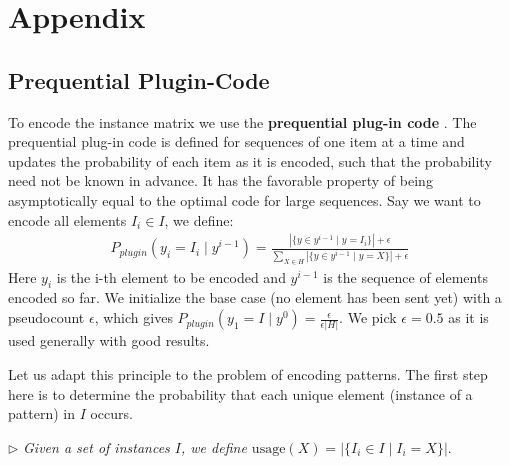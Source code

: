 \documentclass{llncs}
\begin{document}
\section{Appendix}
\label{appendix_a}
\subsection{Prequential Plugin-Code}

To encode the instance matrix we use the \textbf{prequential plug-in code} \cite{grunwaldmdl}. The prequential plug-in code is defined for sequences of one item at a time and updates the probability of each item as it is encoded, such that the probability need not be known in advance. It has the favorable property of being asymptotically equal to the optimal code for large sequences. Say we want to encode all elements ${I}_i \in {I}$, we define:
\begin{align}
P_{plugin}( y_i = {I}_i \mid y^{i-1} ) = \frac{|\{y \in y^{i-1} \mid y = {I}_i\}| + \epsilon }{\sum_{X \in H}|\{y \in y^{i-1} \mid y = X\}| + \epsilon}
\end{align}
Here $y_i$ is the i-th element to be encoded and $y^{i-1}$ is the sequence of elements encoded so far. We initialize the base case (no element has been sent yet) with a pseudocount $\epsilon$, which gives $P_{plugin}( y_1 = {I} \mid y^{0} ) = \frac{\epsilon}{\epsilon|H|}$. We pick $\epsilon=0.5$ as it is used generally with good results.

Let us adapt this principle to the problem of encoding patterns. The first step here is to determine the probability that each unique element (instance of a pattern) in ${I}$ occurs. 

\label{usage}
\smallskip \noindent $\triangleright$
\emph{Given a set of instances ${I}$, we define $\mathrm{usage}(X) = |\{ {I}_i \in {I} \mid {I}_i = X\}|.$}
\smallskip
\end{document}
